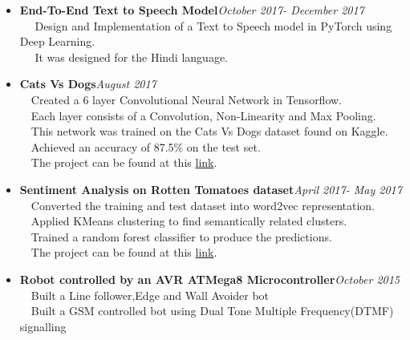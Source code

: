 \documentclass[margin, centered]{res}
\begin{document}
\begin{resume}
\begin{itemize}
\item \textbf{End-To-End Text to Speech Model}\hfill\textit{October 2017- December 2017}\\
~\textbullet~ Design and Implementation of a Text to Speech model in PyTorch using Deep Learning.\\
~\textbullet~ It was designed for the Hindi language.
\end{itemize}

\begin{itemize}
\item \textbf{Cats Vs Dogs}\hfill\textit{August 2017}\\
~\textbullet~Created a 6 layer Convolutional Neural Network in Tensorflow.\\
~\textbullet~Each layer consists of a Convolution, Non-Linearity and Max Pooling.\\
~\textbullet~This network was trained on the Cats Vs Dogs dataset found on Kaggle.\\
~\textbullet~Achieved an accuracy of 87.5\% on the test set.\\
~\textbullet~The project can be found at this \href{https://github.com/harshanavkis/Dogs-Vs-Cats}{link}.
\end{itemize}

\begin{itemize}
\item \textbf{Sentiment Analysis on Rotten Tomatoes dataset}\hfill\textit{April 2017- May 2017}\\
~\textbullet~Converted the training and test dataset into word2vec representation.\\
~\textbullet~Applied KMeans clustering to find semantically related clusters.\\
~\textbullet~Trained a random forest classifier to produce the predictions.\\
~\textbullet~The project can be found at this \href{https://github.com/harshanavkis/Kaggle-Rotten-Tomatoes-Competition}{link}.
\end{itemize}

\begin{itemize}
\item \textbf{Robot controlled by an AVR ATMega8 Microcontroller}\hfill\textit{October 2015}\\
~\textbullet~Built a Line follower,Edge and Wall Avoider bot\\
~\textbullet~Built a GSM controlled bot using Dual Tone Multiple Frequency(DTMF) signalling
\end{itemize}


\end{resume}
\end{document}
